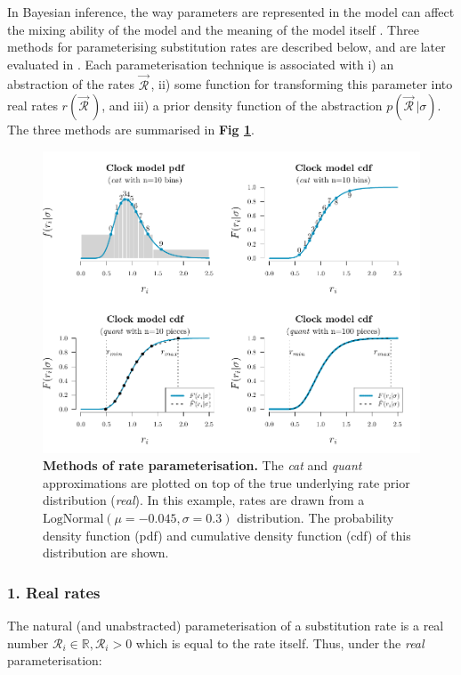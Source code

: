 \documentclass[10pt,letterpaper]{article}
\begin{document}
In Bayesian inference, the way parameters are represented in the model can affect the mixing ability of the model and the meaning of the model itself \cite{gelman2004parameterization}. Three methods for parameterising substitution rates are described below, and are later evaluated in \textbf{}. Each parameterisation technique is associated with i) an abstraction of the rates $\vec{\mathcal{R}}^{\,}$, ii) some function for transforming this parameter into real rates $r(\vec{\mathcal{R}}^{\,})$, and iii) a prior density function of the abstraction $p(\vec{\mathcal{R}}^{\,} | \sigma) $. The three methods are summarised in \textbf{Fig \ref{fig:rateparams}}.


\begin{figure}[!h]
\includegraphics[width=\textwidth]{Figures/rateparameterisation.pdf}
\caption{\textbf{Methods of rate parameterisation.} The \textit{cat} and \textit{quant} approximations are plotted on top of the true underlying rate prior distribution (\textit{real}). In this example, rates are drawn from a $\text{LogNormal}(\mu = -0.045, \sigma = 0.3)$ distribution. The probability density function (pdf) and cumulative density function (cdf) of this distribution are shown.}
\label{fig:rateparams}
\end{figure}




\subsubsection*{1. Real rates}
The natural (and unabstracted) parameterisation of a substitution rate is a real number $\mathcal{R}_i \in \mathbb{R}, \mathcal{R}_i > 0$ which is equal to the rate itself. Thus, under the \textit{real} parameterisation:
\end{document}
